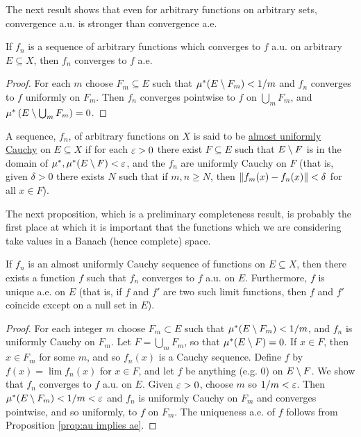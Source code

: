 The next result shows that even for arbitrary functions on arbitrary sets, convergence a.u. is stronger than convergence a.e.

\begin{proposition}
\label{prop:au implies ae}
If $f_n$ is a sequence of arbitrary functions which converges to $f$ a.u. on arbitrary $E \subseteq X$, then $f_n$ converges to $f$ a.e.
\end{proposition}

\begin{proof}
For each $m$ choose $F_m \subseteq E$ such that $\mu^*(E\setminus F_m)<1/m$ and $f_n$ converges to $f$ uniformly on $F_m$. Then $f_n$ converges pointwise to $f$ on $\bigcup_mF_m$, and $\mu^*\left(E\setminus\bigcup_m F_m\right)=0$.
\end{proof}

\begin{definition}
A sequence, $f_n$, of arbitrary functions on $X$ is said to be \underline{almost uniformly Cauchy} on $E \subseteq X$ if for each $\varepsilon>0$ there exist $F \subseteq E$ such that $E\setminus F$ is in the domain of $\mu^*, \mu^*(E\setminus F)<\varepsilon$, and the $f_n$ are uniformly Cauchy on $F$ (that is, given $\delta>0$ there exists $N$ such that if $m, n \geq N$, then $\norm{f_m(x)-f_n(x)}<\delta$ for all $x \in F$).
\end{definition}

The next proposition, which is a preliminary completeness result, is probably the first place at which it is important that the functions which we are considering take values in a Banach (hence complete) space.

\begin{proposition}
\label{prop:au cauchy implies limit}
If $f_n$ is an almost uniformly Cauchy sequence of functions on $E \subseteq X$, then there exists a function $f$ such that $f_n$ converges to $f$ a.u. on $E$. Furthermore, $f$ is unique a.e. on $E$ (that is, if $f$ and $f'$ are two such limit functions, then $f$ and $f'$ coincide except on a null set in $E$).
\end{proposition}

\begin{proof}
For each integer $m$ choose $F_m\subset E$ such that $\mu^*(E\setminus F_m)<1/m$, and $f_n$ is uniformly Cauchy on $F_m$. Let $F=\bigcup_mF_m$, so that $\mu^*(E\setminus F)=0$. If $x \in F$, then $x \in F_m$ for some $m$, and so $f_n(x)$ is a Cauchy sequence. Define $f$ by $f(x)=\lim f_n(x)$ for $x \in F$, and let $f$ be anything (e.g. 0) on $E\setminus F$. We show that $f_n$ converges to $f$ a.u. on $E$. Given $\varepsilon>0$, choose $m$ so $1/m<\varepsilon$. Then $\mu^*(E\setminus F_m)<1/m<\varepsilon$ and $f_n$ is uniformly Cauchy on $F_m$ and converges pointwise, and so uniformly, to $f$ on $F_m$. The uniqueness a.e. of $f$ follows from Proposition \ref{prop:au implies ae}.
\end{proof}

